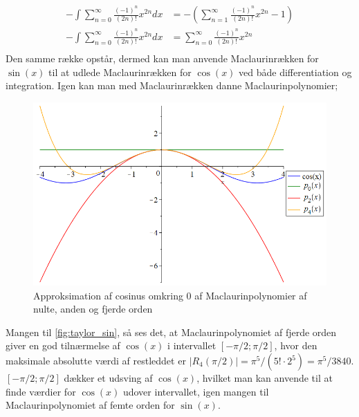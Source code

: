 \begin{align*}
-\int \sum_{n=0}^{\infty} \frac{(-1)^n}{(2n)!}x^{2n} dx
&=
-\left(\sum_{n=1}^{\infty} \frac{(-1)^n}{(2n)!}x^{2n}-1\right) \\
-\int \sum_{n=0}^{\infty} \frac{(-1)^n}{(2n)!}x^{2n} dx
&=
\sum_{n=0}^{\infty} \frac{(-1)^n}{(2n)!}x^{2n} \\
\end{align*}
Den samme række opstår, dermed kan man anvende Maclaurinrækken for $\sin(x)$ til at udlede Maclaurinrækken for $\cos(x)$ ved både differentiation og integration. Igen kan man med Maclaurinrækken danne Maclaurinpolynomier;
\begin{figure}[H]
	\centering
	\includegraphics[scale=0.4]{fig/img/taylor_cos}
	\caption{Approksimation af cosinus omkring 0 af Maclaurinpolynomier af nulte, anden og fjerde orden}
 	\label{fig:taylor_cos}
\end{figure}
Mangen til \ref{fig:taylor_sin}, så ses det, at Maclaurinpolynomiet af fjerde orden giver en god tilnærmelse af $\cos(x)$ i intervallet $[-\pi /2; \pi /2]$, hvor den maksimale absolutte værdi af restleddet er $\left\lvert R_4(\pi/2) \right\lvert = \pi^5/(5! \cdot 2^5) = \pi^5/3840$. $[-\pi /2; \pi /2]$ dækker et udsving af $\cos(x)$, hvilket man kan anvende til at finde værdier for $\cos(x)$ udover intervallet, igen mangen til Maclaurinpolynomiet af femte orden for $\sin(x)$.
